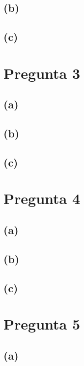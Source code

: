 \documentclass[12pt]{article}
\begin{document}
\subsection*{(b)}

\subsection*{(c)}

\newpage


\section*{Pregunta 3}

\subsection*{(a)}

\subsection*{(b)}

\subsection*{(c)}

\newpage


\section*{Pregunta 4}

\subsection*{(a)}

\subsection*{(b)}

\subsection*{(c)}

\newpage


\section*{Pregunta 5}

\subsection*{(a)}
\end{document}
